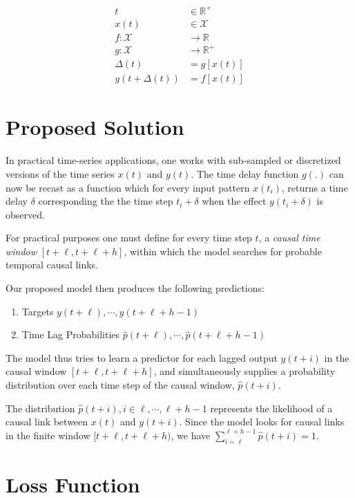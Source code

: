 \documentclass[twoside]{article}
\begin{document}
\begin{align}
t & \in \mathbb{R}^{+}\\
x(t) & \in \mathcal{X} \\
f: \mathcal{X} & \rightarrow \mathbb{R}\\
g: \mathcal{X} & \rightarrow \mathbb{R}^{+}\\
\Delta(t) & = g[x(t)] \\
y(t + \Delta(t)) & = f[x(t)]
\end{align}



\section{Proposed Solution}

In practical time-series applications, one works with sub-sampled or discretized versions of the time 
series $x(t)$ and $y(t)$. The time delay function $g(.)$ can now be recast as a function which for every
input pattern $x(t_i)$, returns a time delay $\delta$ corresponding the the time step $t_i + \delta$ when
the effect $y(t_i + \delta)$ is observed.

For practical purposes one must define for every time step $t$, a \emph{causal time window} $[t+\ell, t+\ell+h]$, 
within which the model searches for probable temporal causal links.

Our proposed model then produces the following predictions:

\begin{enumerate}
\item Targets $y(t+\ell), \cdots, y(t+\ell+h-1)$
\item Time Lag Probabilities $\hat{p}(t+\ell), \cdots, \hat{p}(t+\ell+h-1)$
\end{enumerate}

The model thus tries to learn a predictor for each lagged output $y(t+i)$ in the 
causal window $[t+\ell, t+\ell+h]$, and simultaneously supplies a probability distribution 
over each time step of the causal window, $\hat{p}(t+i)$.

The distribution $\hat{p}(t+i), i \in {\ell, \cdots, \ell+h-1}$ represents the 
likelihood of a causal link between $x(t)$ and $y(t+i)$. Since the model looks
for causal links in the finite window $[t+\ell, t+\ell+h)$, we have 
$\sum^{\ell+h-1}_{i = \ell}{\hat{p}(t + i)} = 1$.


\section{Loss Function}
\end{document}
